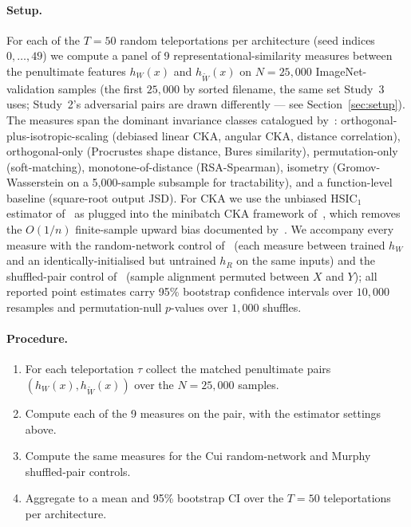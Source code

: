 \paragraph{Setup.}
For each of the $T = 50$ random teleportations per architecture (seed
indices $0,\ldots,49$) we compute a panel of 9 representational-similarity
measures between the penultimate features $h_W(x)$ and $h_{\tilde W}(x)$ on
$N = 25{,}000$ ImageNet-validation samples (the first $25{,}000$ by sorted
filename, the same set Study~3 uses; Study~2's adversarial pairs are drawn
differently --- see Section~\ref{sec:setup}). The measures span
the dominant invariance classes catalogued by~\citet{klabunde2025resi}:
orthogonal-plus-isotropic-scaling (debiased linear CKA, angular CKA,
distance correlation), orthogonal-only (Procrustes shape distance, Bures
similarity), permutation-only (soft-matching), monotone-of-distance
(RSA-Spearman), isometry (Gromov-Wasserstein on a 5{,}000-sample
subsample for tractability), and a function-level baseline (square-root
output JSD). For CKA we use the unbiased HSIC$_1$ estimator
of~\citet{song2012feature} as plugged into the minibatch CKA framework
of~\citet{nguyen2021minibatch}, which removes the $O(1/n)$ finite-sample upward
bias documented by~\citet{murphy2024debiased}.
 We accompany every measure with
the random-network control of~\citet{cui2022deconfounded} (each measure
between trained $h_W$ and an identically-initialised but untrained $h_R$
on the same inputs) and the shuffled-pair control
of~\citet{murphy2024debiased} (sample alignment permuted between $X$ and
$Y$); all reported point estimates carry 95\% bootstrap confidence
intervals over $10{,}000$ resamples and permutation-null $p$-values over
$1{,}000$ shuffles.

\paragraph{Procedure.}
\begin{enumerate}
\item For each teleportation $\tau$ collect the matched penultimate pairs
$(h_W(x), h_{\tilde W}(x))$ over the $N=25{,}000$ samples.
\item Compute each of the 9 measures on the pair, with the estimator
settings above.
\item Compute the same measures for the Cui random-network and Murphy
shuffled-pair controls.
\item Aggregate to a mean and 95\% bootstrap CI over the $T=50$
teleportations per architecture.
\end{enumerate}

